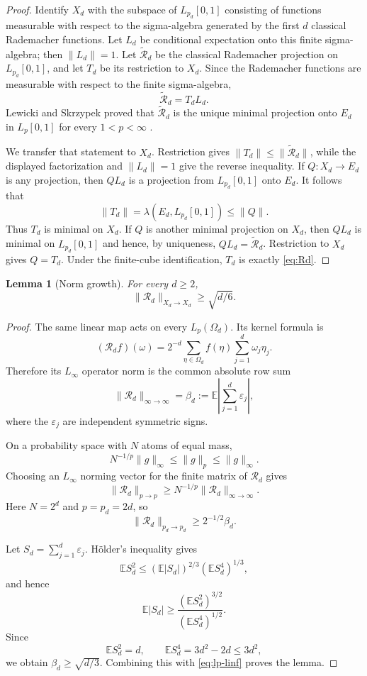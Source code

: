 \documentclass[11pt]{article}
\newtheorem{lemma}[theorem]{Lemma}
\theoremstyle{remark}
\newcommand{\E}{\mathbb{E}}
\begin{document}
\begin{proof}
Identify $X_d$ with the subspace of $L_{p_d}[0,1]$ consisting of functions
measurable with respect to the sigma-algebra generated by the first $d$
classical Rademacher functions.  Let $L_d$ be conditional expectation onto
this finite sigma-algebra; then $\|L_d\|=1$.  Let
$\widetilde{\mathcal R}_d$ be the classical Rademacher projection on
$L_{p_d}[0,1]$, and let $T_d$ be its restriction to $X_d$.  Since the
Rademacher functions are measurable with respect to the finite sigma-algebra,
\[
       \widetilde{\mathcal R}_d=T_dL_d.
\]
Lewicki and Skrzypek proved that $\widetilde{\mathcal R}_d$ is the unique
minimal projection onto $E_d$ in $L_p[0,1]$ for every $1<p<\infty$
\cite{LewickiSkrzypek,Skrzypek}.

We transfer that statement to $X_d$.  Restriction gives
$\|T_d\|\leq\|\widetilde{\mathcal R}_d\|$, while the displayed factorization
and $\|L_d\|=1$ give the reverse inequality.  If $Q:X_d\to E_d$ is any
projection, then $QL_d$ is a projection from $L_{p_d}[0,1]$ onto $E_d$.
It follows that
\[
 \|T_d\|=\lambda(E_d,L_{p_d}[0,1])\leq\|Q\|.
\]
Thus $T_d$ is minimal on $X_d$.  If $Q$ is another minimal projection on
$X_d$, then $QL_d$ is minimal on $L_{p_d}[0,1]$ and hence, by uniqueness,
$QL_d=\widetilde{\mathcal R}_d$.  Restriction to $X_d$ gives $Q=T_d$.
Under the finite-cube identification, $T_d$ is exactly \eqref{eq:Rd}.
\end{proof}

\begin{lemma}[Norm growth]\label{lem:growth}
For every $d\geq2$,
\[
       \|\mathcal R_d\|_{X_d\to X_d}\geq \sqrt{d/6}.
\]
\end{lemma}

\begin{proof}
The same linear map acts on every $L_p(\Omega_d)$.  Its kernel formula is
\[
 (\mathcal R_df)(\omega)
   =2^{-d}\sum_{\eta\in\Omega_d}f(\eta)
       \sum_{j=1}^d\omega_j\eta_j.
\]
Therefore its $L_\infty$ operator norm is the common absolute row sum
\[
 \|\mathcal R_d\|_{\infty\to\infty}
   =\beta_d
   :=\E\left|\sum_{j=1}^d\varepsilon_j\right|,
\]
where the $\varepsilon_j$ are independent symmetric signs.

On a probability space with $N$ atoms of equal mass,
\[
       N^{-1/p}\|g\|_\infty\leq\|g\|_p\leq\|g\|_\infty.
\]
Choosing an $L_\infty$ norming vector for the finite matrix of
$\mathcal R_d$ gives
\[
 \|\mathcal R_d\|_{p\to p}
     \geq N^{-1/p}\|\mathcal R_d\|_{\infty\to\infty}.
\]
Here $N=2^d$ and $p=p_d=2d$, so
\begin{equation}\label{eq:lp-linf}
       \|\mathcal R_d\|_{p_d\to p_d}\geq 2^{-1/2}\beta_d.
\end{equation}

Let $S_d=\sum_{j=1}^d\varepsilon_j$.  H\"older's inequality gives
\[
 \E S_d^2
 \leq (\E|S_d|)^{2/3}(\E S_d^4)^{1/3},
\]
and hence
\[
 \E|S_d|\geq
 \frac{(\E S_d^2)^{3/2}}{(\E S_d^4)^{1/2}}.
\]
Since
\[
 \E S_d^2=d,
 \qquad
 \E S_d^4=3d^2-2d\leq3d^2,
\]
we obtain $\beta_d\geq\sqrt{d/3}$.  Combining this with
\eqref{eq:lp-linf} proves the lemma.
\end{proof}
\end{document}
